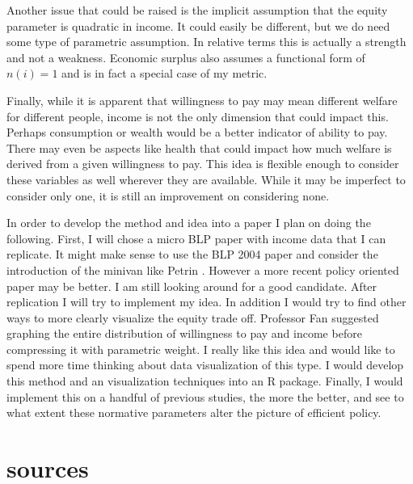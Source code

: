 \documentclass[11pt]{article}
\begin{document}
Another issue that could be raised is the implicit assumption that the equity parameter is quadratic in income. It could easily be different, but we do need some type of parametric assumption. In relative terms this is actually a strength and not a weakness. Economic surplus also assumes a functional form of $ n(i) = 1$ and is in fact a special case of my metric.
 
Finally, while it is apparent that willingness to pay may mean different welfare for different people, income is not the only dimension that could impact this. Perhaps consumption or wealth would be a better indicator of ability to pay. There may even be aspects like health that could impact how much welfare is derived from a given willingness to pay. This idea is flexible enough to consider these variables as well wherever they are available. While it may be imperfect to consider only one, it is still an improvement on considering none. 

In order to develop the method and idea into a paper I plan on doing the following. First, I will chose a micro BLP paper with income data that I can replicate. It might make sense to use the BLP 2004 paper and consider the introduction of the minivan like Petrin \cite{Berry2004} \cite{Petrin2002}. However a more recent policy oriented paper may be better. I am still looking around for a good candidate. After replication I will try to implement my idea. In addition I would try to find other ways to more clearly visualize the equity trade off. Professor Fan suggested graphing the entire distribution of willingness to pay and income before compressing it with parametric weight. I really like this idea and would like to spend more time thinking about data visualization of this type. I would develop this method and an visualization techniques into an R package. Finally,  I would implement this on a handful of previous studies, the more the better, and see to what extent these normative parameters alter the picture of efficient policy. 


\section{sources}




\end{document}
